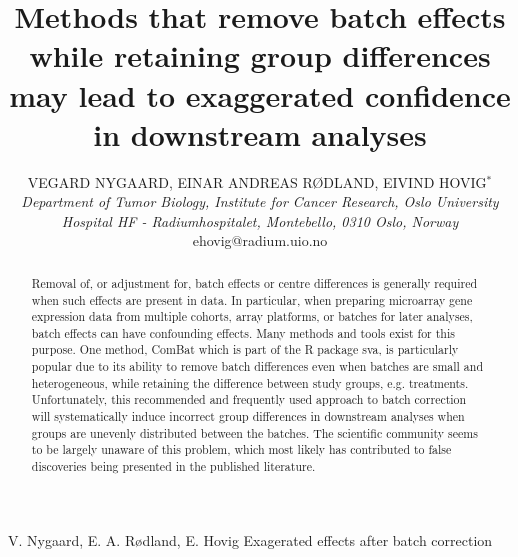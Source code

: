 \documentclass{bio}
\begin{document}
\title{Methods that remove batch effects while retaining group differences may lead
to exaggerated confidence in downstream analyses
}

\author{VEGARD NYGAARD, EINAR ANDREAS R\O{}DLAND, EIVIND HOVIG$^\ast$\\[4pt]
\textit{Department of Tumor Biology,
Institute for Cancer Research,
Oslo University Hospital HF - Radiumhospitalet,
Montebello,
0310 Oslo,
Norway}
\\[2pt]
{ehovig@radium.uio.no}}

\markboth%
{V. Nygaard, E. A. R\o{}dland, E. Hovig}
{Exagerated effects after batch correction}

\maketitle


\begin{abstract}
{Removal of, or adjustment for, batch effects or centre differences is generally required when such effects are present in data. In particular, when preparing microarray gene expression data from multiple cohorts, array platforms, or batches for later analyses, batch effects can have confounding effects. Many methods and tools exist for this purpose. One method, ComBat which is part of the R package sva, is particularly popular due to its ability to remove batch differences even when batches are small and heterogeneous, while retaining the difference between study groups, e.g. treatments. Unfortunately, this recommended and frequently used approach to batch correction will systematically induce incorrect group differences in downstream analyses when groups are unevenly distributed between the batches. The scientific community seems to be largely unaware of this problem, which most likely has contributed to false discoveries being presented in the published literature.
}
\end{abstract}


%
\newcommand\NB[1]{{\color{red}#1}}
\newcommand\NOTE[1]{{\color{red}[#1]}}
\newcommand\CITE[1]{{\color{magenta}[#1]}}
\end{document}
